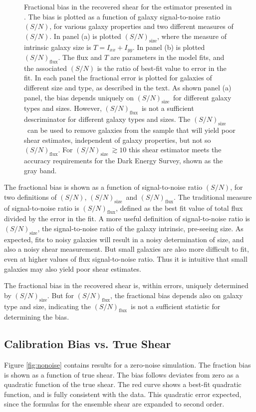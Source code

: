 \documentclass[12pt,preprint]{aastex}
\newcommand{\Tsn}{$(S/N)_{\textrm{size}}$}
\newcommand{\fsn}{$(S/N)_{\textrm{flux}}$}
\begin{document}
\begin{figure}[p]
 \caption{ Fractional bias in the recovered shear for the estimator presented
     in \cite{ba13}.  The bias is plotted as a
     function of galaxy signal-to-noise ratio $(S/N)$, for various galaxy
     properties and two different measures of $(S/N)$.  In panel (a) is
     plotted \Tsn, where the measure of intrinsic galaxy size is $T=I_{xx} + I_{yy}$.  In 
     panel (b) is plotted \fsn.  The flux and $T$ are parameters in the model
     fits, and the associated $(S/N)$ is the ratio of best-fit value to error in
     the fit.  In each panel the fractional error is plotted for galaxies of
     different size and type, as described in the text.  As shown panel (a)
     panel, the bias depends uniquely on \Tsn\ for different galaxy types and
     sizes.  However, \fsn\ is not a sufficient descriminator for different
     galaxy types and sizes.  The \Tsn\ can be used to remove galaxies from the
     sample that will yield poor shear estimates, independent of galaxy
     properties, but not so \fsn.  For \Tsn$~ \gtrsim 10$ this shear estimator meets
 the accuracy requirements for the Dark Energy Survey, shown as the gray band.
 \label{fig:fracerr}}

\end{figure}

The fractional bias is shown as a function of signal-to-noise ratio $(S/N)$,
for two definitions of $(S/N)$, \Tsn\ and \fsn.  The traditional measure of
signal-to-noise ratio is \fsn, defined as the best fit value of total flux
divided by the error in the fit.  A more useful definition of signal-to-noise
ratio is \Tsn, the signal-to-noise ratio of the galaxy intrinsic, pre-seeing
size.  As expected, fits to noisy galaxies will result in a noisy determination
of size, and also a noisy shear measurement. But small galaxies are also more
difficult to fit, even at higher values of flux signal-to-noise ratio.  Thus it
is intuitive that small galaxies may also yield poor shear estimates.

The fractional bias in the recovered shear is, within errors, uniquely
determined by \Tsn.  But for \fsn, the fractional bias depends also on galaxy
type and size, indicating the \fsn\ is not a sufficient statistic for
determining the bias.

\subsection{Calibration Bias vs. True Shear} \label{sec:truebias}

Figure \ref{fig:nonoise} contains results for a zero-noise simulation.  The
fraction bias is shown as a function of true shear.  The bias follows deviates
from zero as a quadratic function of the true shear.  The red curve shows a
best-fit quadratic function, and is fully consistent with the data.  This
quadratic error expected, since the formulas for the ensemble shear are expanded
to second order.
\end{document}
